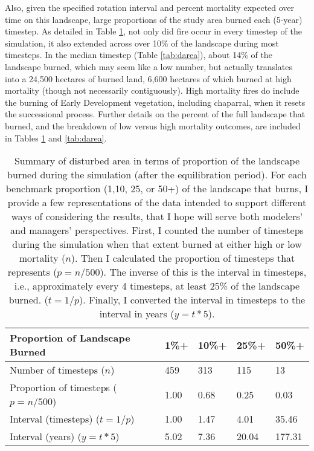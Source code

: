 Also, given the specified rotation interval and percent mortality expected over time on this landscape, large proportions of the study area burned each (5-year) timestep. As detailed in Table \ref{tab:darea_atleast}, not only did fire occur in every timestep of the simulation, it also extended across over 10\% of the landscape during most timesteps. In the median timestep (Table \ref{tab:darea}), about 14\% of the landscape burned, which may seem like a low number, but actually translates into a 24,500 hectares of burned land, 6,600 hectares of which burned at high mortality (though not necessarily contiguously). High mortality fires do include the burning of Early Development vegetation, including chaparral, when it resets the successional process. Further details on the percent of the full landscape that burned, and the breakdown of low versus high mortality outcomes, are included in Tables \ref{tab:darea_atleast} and \ref{tab:darea}.

\begin{table}[!htbp]
\footnotesize
\centering
\caption{Summary of disturbed area in terms of proportion of the landscape burned during the simulation (after the equilibration period). For each benchmark proportion (1,10, 25, or 50+) of the landscape that burns, I provide a few representations of the data intended to support different ways of considering the results, that I hope will serve both modelers' and managers' perspectives. First, I counted the number of timesteps during the simulation when that extent burned at either high or low mortality ($n$). Then I calculated the proportion of timesteps that represents ($p = n/500$). The inverse of this is the interval in timesteps, i.e., approximately every 4 timesteps, at least 25\% of the landscape burned. ($t = 1/p$). Finally, I converted the interval in timesteps to the interval in years ($y = t * 5$).}
\label{tab:darea_atleast}
\begin{tabular}{@{}lllll@{}}
\toprule
\textbf{Proportion of Landscape Burned} & \textbf{1\%+}     & \textbf{10\%+}    & \textbf{25\%+}    & \textbf{50\%+} \\ \midrule
Number of timesteps ($n$)        & 459              & 313              & 115              & 13            \\
Proportion of timesteps ($p = n/500$)    & 1.00             & 0.68             & 0.25             & 0.03          \\
Interval (timesteps) ($t = 1/p$)      & 1.00             & 1.47             & 4.01             & 35.46         \\
Interval (years)    ($y = t * 5$)       & 5.02             & 7.36             & 20.04            & 177.31        \\ \bottomrule
\end{tabular}
\end{table}

